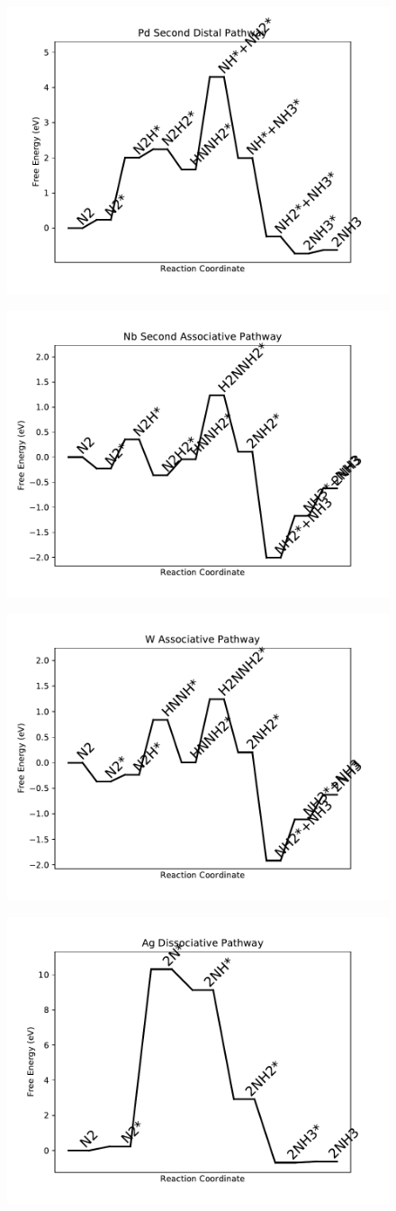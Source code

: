 \documentclass[journal=jacsat,manuscript=article]{achemso}
\begin{document}
\begin{figure}
\includegraphics[width=0.5\linewidth]{data/plots/Pd_distal_2.pdf}
\label{fig:Pd_distal_2}
\end{figure}

\begin{figure}
\includegraphics[width=0.5\linewidth]{data/plots/Nb_associative_2.pdf}
\label{fig:Nb_associative_2}
\end{figure}

\begin{figure}
\includegraphics[width=0.5\linewidth]{data/plots/W_associative.pdf}
\label{fig:W_associative}
\end{figure}

\begin{figure}
\includegraphics[width=0.5\linewidth]{data/plots/Ag_dissociative.pdf}
\label{fig:Ag_dissociative}
\end{figure}
\end{document}
